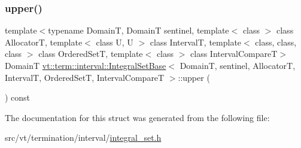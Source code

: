 \mbox{\label{structvt_1_1term_1_1interval_1_1_integral_set_base_a88ef66995c9fd0c1d8ba031dab28da9b}} 
\subsubsection{\texorpdfstring{upper()}{upper()}}
{\footnotesize\ttfamily template$<$typename DomainT, DomainT sentinel, template$<$ class $>$ class AllocatorT, template$<$ class U, U $>$ class IntervalT, template$<$ class, class, class $>$ class Ordered\+SetT, template$<$ class $>$ class Interval\+CompareT$>$ \\
DomainT \hyperlink{structvt_1_1term_1_1interval_1_1_integral_set_base}{vt\+::term\+::interval\+::\+Integral\+Set\+Base}$<$ DomainT, sentinel, AllocatorT, IntervalT, Ordered\+SetT, Interval\+CompareT $>$\+::upper (\begin{DoxyParamCaption}{ }\end{DoxyParamCaption}) const\hspace{0.3cm}{\ttfamily [inline]}}



The documentation for this struct was generated from the following file\+:\begin{DoxyCompactItemize}
\item 
src/vt/termination/interval/\hyperlink{integral__set_8h}{integral\+\_\+set.\+h}\end{DoxyCompactItemize}
